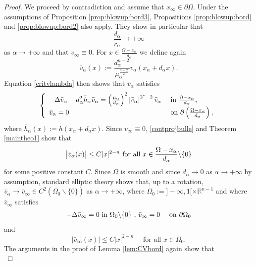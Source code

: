\documentclass[10pt]{amsart}
\numberwithin{equation}{section}
\newcommand{\Om}{\Omega}
\newcommand{\ma}{\mu_\alpha}
\def \rr {\mathbb{R}}
\def \bb{\hbox}
\def \xl{x_\alpha}
\def\la{\alpha}
\def \vb{\bar{v}_{\alpha}}
\def \ma{\mu_{\alpha}}
\def \da{d_{\alpha}}
\def \hb{\bar{h}_{\alpha}}
\theoremstyle{plain}
\theoremstyle{remark}
\begin{document}
\begin{proof}
We proceed by contradiction and assume that $x_\infty \in \partial \Om$. Under the assumptions of Proposition \ref{prop:blowup:bord3}, Propositions \ref{prop:blowup:bord} and \ref{prop:blowup:bord2} also apply. They show in particular that  
\begin{equation} \label{hypothese:finale}
\frac{d_\alpha}{r_\alpha} \to + \infty
\end{equation} as $\alpha \to + \infty$ and that $v_\infty \equiv 0$. For $x \in \frac{\Om-\xl}{d_{\la}}$ we define again 
		\begin{equation}\label{vb2bis}
			\vb(x):=\frac{d_{\la}^{n-2}}{\ma^{\frac{n-2}{2}}}v_{\la}(\xl+d_{\la}x). 
		\end{equation}
Equation \eqref{critvlambda} then shows that $\vb$ satisfies
\begin{equation*} 
	\left\{\begin{array}{ll}
		-\Delta\vb -d_{\la}^2\hb \vb=\left(\frac{\ma}{d_{\la}} \right)^2 \left|\vb\right|^{2^*-2}\vb &\hbox{ in } \frac{
			\Om-\xl}{d_{\alpha}}, \\
		\vb= 0  &\hbox{ on } \partial\left(  \frac{
			\Om-\xl}{d_{\alpha}}\right),
	\end{array}\right.
\end{equation*}
where $\hb(x):=h(\xl+\da x)$. Since $v_\infty \equiv 0$, \eqref{contprojbulle} and Theorem \ref{maintheo1} show that 
\begin{equation} \label{eq:contbarva2}
	\big|\vb(x) \big| \leq C |x|^{2-n}\bb{ for all } x\in \frac{
		\Om-\xl}{d_{\alpha}} \backslash \{0\}
\end{equation}	
for some positive constant $C$. Since $\Om$ is smooth and since $d_\alpha \to 0$ as $\alpha \to + \infty$ by assumption, standard elliptic theory shows that, up to a rotation,  $\vb \to \bar{v}_{\infty}\in C^2(\overline{\Om_0} \backslash \{0\})$  as $\alpha\to +\infty$, where $\Om_0:= ]-\infty,1[\times \rr^{n-1}$  and where $\bar{v}_{\infty}$ satisfies 
\begin{eqnarray*} 
		-\Delta\bar{v}_\infty =0 &\hbox{ in } \Om_{0}\backslash\{0\} \bb{ , }	\bar{v}_\infty= 0  &\hbox{ on } \partial \Om_{0}
\end{eqnarray*}
and	
\begin{equation*} 
|\bar{v}_\infty (x) \big| \leq C |x|^{2-n} \quad \text{ for all } x\in \Om_0.
\end{equation*} 
The arguments in the proof of Lemma \ref{lem:CVbord} again show that 
	\begin{equation}  \label{lem:CVbord2}

\end{equation}
\end{proof}
\end{document}
